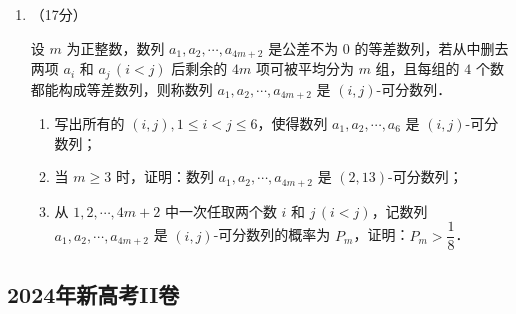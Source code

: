 \begin{description}
\begin{enumerate}[leftmargin=5pt]
        \begin{enumerate}[label=(\arabic*)]
            \item 若 $b=0$，且 $f'(x)\geqslant0$，求 $a$ 的最小值；
            \item 证明：曲线 $y=f(x)$ 是中心对称图形；
            \item 若 $f(x)>-2$ 当且仅当 $1<x<2$，求 $b$ 的取值范围．
        \end{enumerate}

        \item （17分）

        设 $m$ 为正整数，数列 $a_1,a_2,\cdots,a_{4m+2}$ 是公差不为 $0$ 的等差数列，若从中删去两项 $a_i$ 和 $a_j\,(i<j)$ 后剩余的 $4m$ 项可被平均分为 $m$ 组，且每组的 $4$ 个数都能构成等差数列，则称数列 $a_1,a_2,\cdots,a_{4m+2}$ 是 $(i,j)$-可分数列．

        \begin{enumerate}[label=(\arabic*)]
            \item 写出所有的 $(i,j),1\leqslant i<j\leqslant6$，使得数列 $a_1,a_2,\cdots,a_6$ 是 $(i,j)$-可分数列；
            \item 当 $m\geqslant3$ 时，证明：数列 $a_1,a_2,\cdots,a_{4m+2}$ 是 $(2,13)$-可分数列；
            \item 从 $1,2,\cdots,4m+2$ 中一次任取两个数 $i$ 和 $j\,(i<j)$，记数列 $a_1,a_2,\cdots,a_{4m+2}$ 是 $(i,j)$-可分数列的概率为 $P_m$，证明：$P_m>\dfrac{1}{8}$．
        \end{enumerate}
    \end{enumerate}
\end{description}
\clearpage


\subsection{2024年新高考II卷}\label{gk:2024年新高考II卷}


